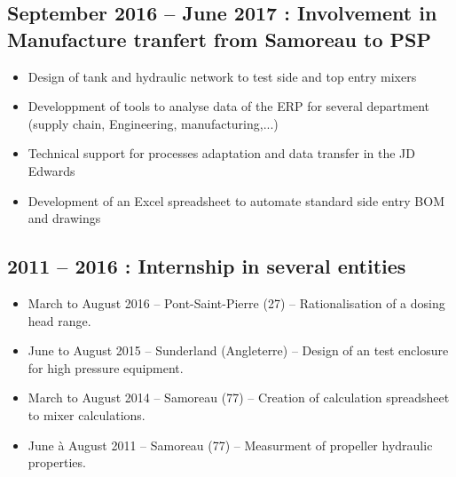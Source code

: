 \documentclass[10pt,a4paper,sans]{article}
\begin{document}
\begin{minipage}[t]{0.68\textwidth}
    \subsection{September 2016 -- June 2017 : Involvement in Manufacture tranfert from Samoreau to PSP}
    \begin{itemize}
        \item{Design of tank and hydraulic network to test side and top entry mixers}
        \item{Developpment of tools to analyse data of the ERP for several department (supply chain, Engineering, manufacturing,...)}
        \item{Technical support for processes adaptation and data transfer in the JD Edwards}
        \item{Development of an Excel spreadsheet to automate standard side entry BOM and drawings}
    \end{itemize}


    \subsection{2011 -- 2016 : Internship in several entities}
    \begin{itemize}
        \item{March to August 2016 -- Pont-Saint-Pierre (27) -- Rationalisation of a dosing head range.}
        \item{June to August 2015 -- Sunderland (Angleterre) -- Design of an test enclosure for high pressure equipment.}
        \item{March to August 2014 -- Samoreau (77) -- Creation of calculation spreadsheet to mixer calculations.}
        \item{June à August 2011 -- Samoreau (77) -- Measurment of propeller hydraulic properties.}
    \end{itemize}
\end{minipage}
\end{document}
